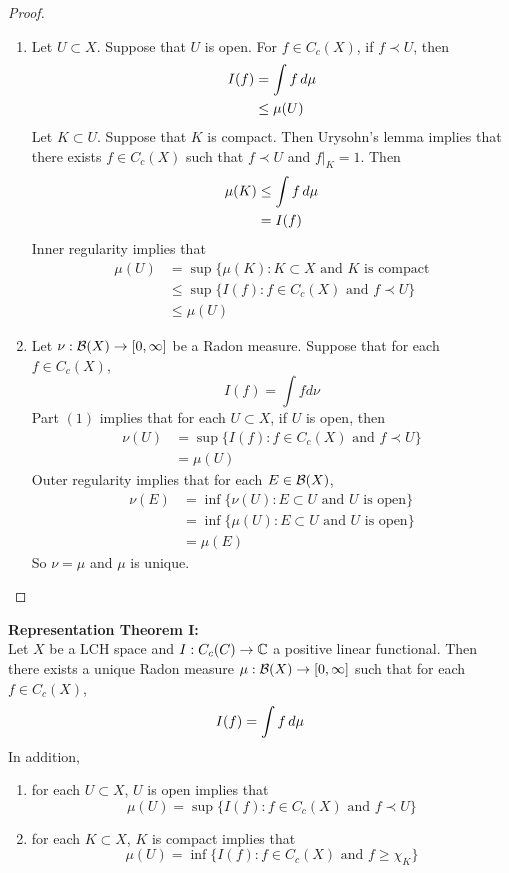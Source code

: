 \documentclass{book}
\begin{document}
	\begin{proof}\
		\begin{enumerate}
			\item Let $U \subset X$. Suppose that $U$ is open. For $f \in C_c(X)$, if $f \prec U$, then 
			\begin{align*}
				I(f) 
				&= \int f \, d \mu \\
				& \leq \mu(U) 
			\end{align*}
			Let $K \subset U$. Suppose that $K$ is compact. Then Urysohn's lemma implies that there exists $f \in C_c(X)$ such that $f \prec U$ and $f|_K = 1$. Then 
			\begin{align*}
				\mu(K) 
				&\leq \int f \, d \mu \\
				&= I(f)
			\end{align*}
			Inner regularity implies that 
			\begin{align*}
				\mu(U) 
				&= \sup \{\mu(K): K \subset X \text{ and $K$ is compact} \\
				& \leq \sup \{I(f): f \in C_c(X) \text{ and } f \prec U \} \\
				&\leq \mu(U)
			\end{align*}
			\item Let $\nu: \mathcal{B}(X) \rightarrow [0,\infty]$ be a Radon measure. Suppose that for each $f \in C_c(X)$, $$I(f) = \int f d\nu$$
			Part $(1)$ implies that for each $U \subset X$, if $U$ is open, then 
			\begin{align*}
				\nu(U) 
				&= \sup \{I(f): f \in C_c(X) \text{ and } f \prec U \} \\
				&= \mu(U)
			\end{align*}		
			Outer regularity implies that for each $E \in \mathcal{B}(X)$, 
			\begin{align*}
				\nu(E) 
				&= \inf \{\nu(U): E \subset U \text{ and $U$ is open}\} \\
				&= \inf \{\mu(U): E \subset U \text{ and $U$ is open}\} \\
				&= \mu(E)
			\end{align*}
			So $\nu = \mu$ and $\mu$ is unique.
		\end{enumerate}		  
	\end{proof}
	
	\begin{thm}\textbf{Representation Theorem I:}\\
		Let $X$ be a LCH space and $I: C_c(C) \rightarrow \mathbb{C}$ a positive linear functional. Then there exists a unique Radon measure $\mu:\mathcal{B}(X) \rightarrow [0,\infty]$ such that for each $f \in C_c(X)$, $$I(f) = \int f \, d \mu$$ 
		In addition, 
		\begin{enumerate}
			\item for each $U \subset X$, $U$ is open implies that $$\mu(U) = \sup \{I(f): f \in C_c(X) \text{ and } f \prec U \}$$
			\item for each $K \subset X$, $K$ is compact implies that $$\mu(U) = \inf \{I(f): f \in C_c(X) \text{ and } f  \geq \chi_K \}$$
		\end{enumerate}	 
	\end{thm}
	
\end{document}
